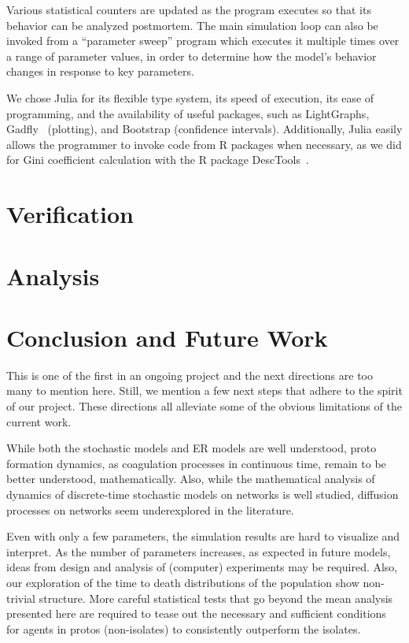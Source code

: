 Various statistical counters are updated as the program executes so that its behavior can be analyzed postmortem. The main simulation loop can also be invoked from a ``parameter sweep'' program which executes it multiple times over a range of parameter values, in order to determine how the model's behavior changes in response to key parameters.

We chose Julia for its flexible type system, its speed of execution, its ease of programming, and the availability of useful packages, such as LightGraphs, Gadfly~\cite{Gadfly-2018} (plotting), and Bootstrap (confidence intervals).  Additionally, Julia easily allows the programmer to invoke code from R packages when necessary, as we did for Gini coefficient calculation with the R package DescTools~\cite{DescTools-2019}.


\section{Verification}


\section{Analysis}

\section{Conclusion and Future Work}
This is one of the first in an ongoing project and the next directions are too many to mention here. Still, we mention a few next steps that adhere to the spirit of our project. These directions all alleviate some of the obvious limitations of the current work. 

While both the stochastic models and ER models are well understood, proto formation dynamics, as coagulation processes in continuous time, remain to be better understood, mathematically. Also, while the mathematical analysis of dynamics of discrete-time stochastic models on networks is well studied, diffusion processes on networks seem underexplored in the literature. 

Even with only a few parameters, the simulation results are hard to visualize and interpret. As the number of parameters increases, as expected in future models, ideas from design and analysis of (computer) experiments may be required. Also, our exploration of the time to death distributions of the population show non-trivial structure. More careful statistical tests that go beyond the mean analysis presented here are required to tease out the necessary and sufficient conditions for agents in protos (non-isolates) to consistently outperform the isolates.   

